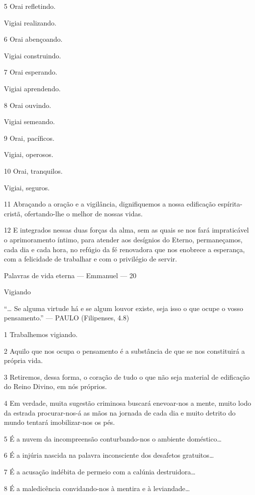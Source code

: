 \documentclass{rbfin}
\begin{document}
\begin{multicols}{2}
5 Orai refletindo.

Vigiai realizando.


6 Orai abençoando.

Vigiai construindo.


7 Orai esperando.

Vigiai aprendendo.


8 Orai ouvindo.

Vigiai semeando.


9 Orai, pacíficos.

Vigiai, operosos.


10 Orai, tranquilos.

Vigiai, seguros.


11 Abraçando a oração e a vigilância, dignifiquemos a nossa edificação espírita-cristã, ofertando-lhe o melhor de nossas vidas. 

\newpage

12 E integrados nessas duas forças da alma, sem as quais se nos fará impraticável o aprimoramento íntimo, para atender aos desígnios do Eterno, permaneçamos, cada dia e cada hora, no refúgio da fé renovadora que nos enobrece a esperança, com a felicidade de trabalhar e com o privilégio de servir.

\dotfill

Palavras de vida eterna — Emmanuel --- 20

Vigiando

“… Se alguma virtude há e se algum louvor existe, seja isso o que ocupe o vosso pensamento.” — PAULO (Filipenses, 4.8)

1 Trabalhemos vigiando.

2 Aquilo que nos ocupa o pensamento é a substância de que se nos constituirá a própria vida.

3 Retiremos, dessa forma, o coração de tudo o que não seja material de edificação do Reino Divino, em nós próprios.

4 Em verdade, muita sugestão criminosa buscará enevoar-nos a mente, muito lodo da estrada procurar-nos-á as mãos na jornada de cada dia e muito detrito do mundo tentará imobilizar-nos os pés.

5 É a nuvem da incompreensão conturbando-nos o ambiente doméstico…

6 É a injúria nascida na palavra inconsciente dos desafetos gratuitos…

\newpage

7 É a acusação indébita de permeio com a calúnia destruidora…

8 É a maledicência convidando-nos à mentira e à leviandade…


\end{multicols}
\end{document}
